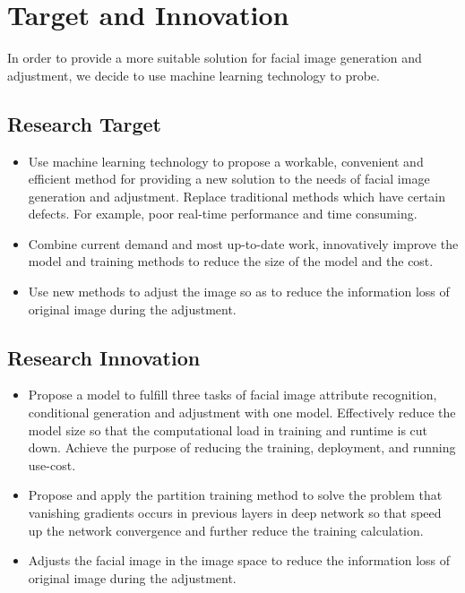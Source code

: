 \section{Target and Innovation}

In order to provide a more suitable solution for facial image generation and adjustment,
    we decide to use machine learning technology to probe.

\subsection{Research Target}
\begin{itemize}
\item Use machine learning technology to propose a workable,
    convenient and efficient method for providing a new solution to the needs of facial image generation and adjustment.
    Replace traditional methods which have certain defects. For example, poor real-time performance and time consuming.
\item Combine current demand and most up-to-date work, 
    innovatively improve the model and training methods to reduce the size of the model and the cost.
\item Use new methods to adjust the image so as to reduce the information loss of original image during the adjustment.
\end{itemize}
\subsection{Research Innovation}
\begin{itemize}
\item Propose a model to fulfill three tasks of facial image attribute recognition,
    conditional generation and adjustment with one model.
    Effectively reduce the model size so that the computational load in training and runtime is cut down.
    Achieve the purpose of reducing the training, deployment, and running use-cost.
\item Propose and apply the partition training method to solve the problem that vanishing gradients occurs in previous layers in deep network so that speed up the network convergence and further reduce the training calculation.

\item Adjusts the facial image in the image space to reduce the information loss of original image during the adjustment.
\end{itemize}